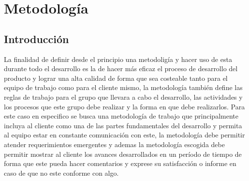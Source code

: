 \chapter{Metodología}
\section{Introducción}

La finalidad de definir desde el principio una metodoligía y hacer uso de esta durante todo el desarrollo es la de hacer más eficaz el proceso de desarrollo del producto y lograr una alta calidad de forma que sea costeable tanto para el equipo de trabajo como para el cliente mismo, la metodología también define las reglas de trabajo para el grupo que llevara a cabo el desarrollo, las actividades y los procesos que este grupo debe realizar y la forma en que debe realizarlos.
\newline
Para este caso en especifico se busca una metodología de trabajo que principalmente incluya al cliente como una de las partes fundamentales del desarrollo y permita al equipo estar en constante comunicación con este, la metodología debe permitir atender requerimientos emergentes y ademas la metodología escogida debe permitir mostrar al cliente los avances desarrollados en un período de tiempo de forma que este pueda hacer comentarios y exprese su satisfacción o informe en caso de que no este conforme con algo.
\newpage

